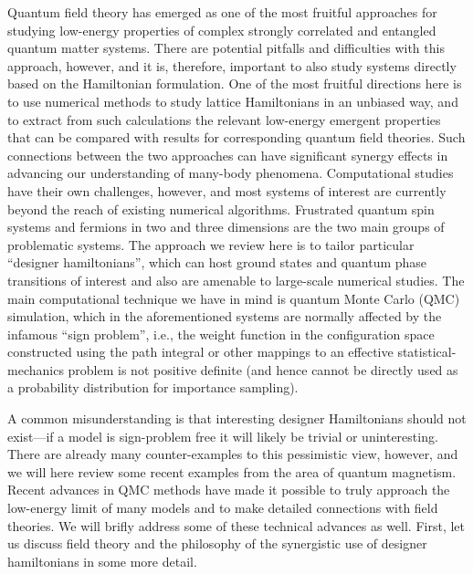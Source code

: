 \documentclass[aps,prb,groupedaddress,twocolumn]{revtex4}
\begin{document}
Quantum field theory has emerged as one of the most fruitful approaches for studying low-energy properties of
complex strongly correlated and entangled quantum matter systems. There are potential pitfalls and difficulties 
with this approach, however, and it is, therefore, important to also study systems directly based on the Hamiltonian 
formulation. One of the most fruitful directions here is to use numerical methods to study lattice Hamiltonians 
in an unbiased way, and to extract from such calculations the relevant low-energy emergent properties that can 
be compared with results for corresponding quantum field theories. Such connections between the two approaches 
can have significant synergy effects in advancing our understanding of many-body phenomena. Computational studies 
have their own challenges, however, and most systems of interest are currently 
beyond the reach of existing numerical algorithms. Frustrated quantum spin systems and fermions in two and three 
dimensions are the two main groups of problematic systems. The approach we review here is to tailor particular 
``designer hamiltonians'', which can host ground states and quantum phase transitions of interest and also are 
amenable to large-scale numerical studies. The main computational technique we have in mind is quantum Monte Carlo 
(QMC) simulation, which in the aforementioned systems are normally affected by the infamous ``sign problem'', 
i.e., the weight function in the configuration space constructed using the path integral or other mappings to 
an effective statistical-mechanics problem is not positive definite (and hence cannot be directly used as 
a probability distribution for importance sampling).

A common misunderstanding is that interesting designer Hamiltonians should not exist---if a model is sign-problem 
free it will likely be trivial or uninteresting. There are already many counter-examples to this pessimistic view, however, 
and we will here review some recent examples from the area of quantum magnetism. Recent advances in QMC methods have made 
it possible to truly approach the low-energy limit of many models and to make detailed connections with field theories. 
We will brifly address some of these technical advances as well. First, let us discuss field theory and the 
philosophy of the synergistic use of designer hamiltonians in some more detail.
\end{document}
